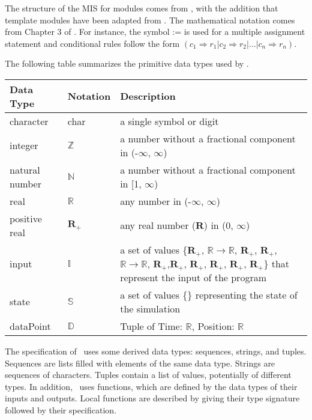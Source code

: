 \documentclass[12pt, titlepage]{article}
\begin{document}

The structure of the MIS for modules comes from \citet{HoffmanAndStrooper1995},
with the addition that template modules have been adapted from
\cite{GhezziEtAl2003}.  The mathematical notation comes from Chapter 3 of
\citet{HoffmanAndStrooper1995}.  For instance, the symbol := is used for a
multiple assignment statement and conditional rules follow the form $(c_1
\Rightarrow r_1 | c_2 \Rightarrow r_2 | ... | c_n \Rightarrow r_n )$.

The following table summarizes the primitive data types used by \progname. 

\begin{center}
\renewcommand{\arraystretch}{1.2}
\noindent 
\begin{tabular}{l l p{7.5cm}} 
\toprule 
\textbf{Data Type} & \textbf{Notation} & \textbf{Description}\\ 
\midrule
character & char & a single symbol or digit\\
integer & $\mathbb{Z}$ & a number without a fractional component in (-$\infty$, $\infty$) \\
natural number & $\mathbb{N}$ & a number without a fractional component in [1, $\infty$) \\
real & $\mathbb{R}$ & any number in (-$\infty$, $\infty$)\\
positive real & $\mathbf{R}_{+}$ & any real number ($\mathbf{R}$) in ($0$, $\infty$) \\
input & $\mathbb{I}$ & a set of values \{$\mathbf{R}_{+}$, $\mathbb{R} \rightarrow \mathbb{R}$, $\mathbf{R}_{+}$, $\mathbf{R}_{+}$, $\mathbb{R} \rightarrow \mathbb{R}$, $\mathbf{R}_{+}$,$\mathbf{R}_{+}$, $\mathbf{R}_{+}$, $\mathbf{R}_{+}$, $\mathbf{R}_{+}$, $\mathbf{R}_{+}$\} that represent the input of the program \\
state & $\mathbb{S}$ & a set of values \{\} representing the state of the simulation \\
dataPoint & $\mathbb{D}$ & Tuple of Time: $\mathbb{R}$, Position: $\mathbb{R}$\\
\end{tabular} 
\end{center}

\noindent
The specification of \progname \ uses some derived data types: sequences, strings, and
tuples. Sequences are lists filled with elements of the same data type. Strings
are sequences of characters. Tuples contain a list of values, potentially of
different types. In addition, \progname \ uses functions, which
are defined by the data types of their inputs and outputs. Local functions are
described by giving their type signature followed by their specification.
\end{document}
